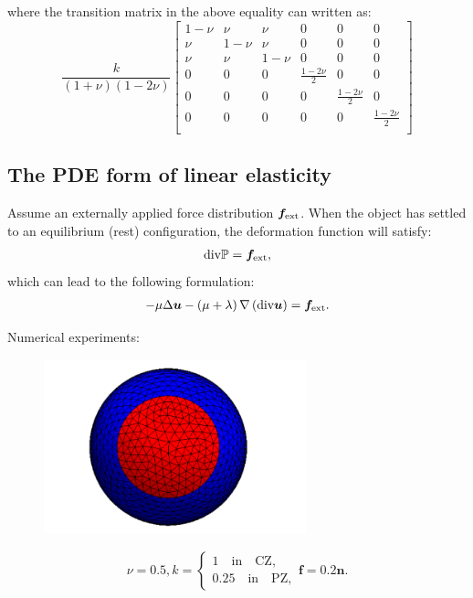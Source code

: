 \documentclass[11pt]{amsart}
\numberwithin{figure}{section}
\theoremstyle{plain}
\theoremstyle{definition}
\numberwithin{equation}{section}
\begin{document}
where the transition matrix in the above equality can written as:
\[
\frac{ k }{ \left(1+\nu\right) \left(1-2\nu\right) } 
\left[
\begin{array}{cccccc}
1 - \nu & \nu & \nu & 0 & 0 & 0 \\
\nu & 1 - \nu & \nu & 0 & 0 & 0 \\
\nu & \nu & 1 - \nu & 0 & 0 & 0 \\
0 & 0 & 0 & \frac{ 1-2\nu }{2 }  & 0 & 0 \\
0 & 0 & 0 & 0 & \frac{ 1-2\nu }{ 2 }  & 0 \\
0 & 0 & 0 & 0 & 0 & \frac{ 1-2\nu }{ 2 }  \\
\end{array}
\right]
\] 

\subsection{The PDE form of linear elasticity}
Assume an externally applied force distribution $\bm{f}_{\rm ext} $.
When the object has settled to an equilibrium (rest) configuration, the deformation function will satisfy: 
\begin{align}
  \text{div} \mathbb{P}  = \bm{f}_{\rm ext},  
\end{align}
which can lead to the following formulation:
\begin{align}
  - \mu \Delta \bm{u} 
  - \left(\mu + \lambda\right) \nabla 
  \left( \text{div} \bm{u} \right) 
  = \bm{f}_{\rm ext} .
\end{align}

Numerical experiments:
\begin{figure}[!tbh]
\includegraphics[width=3in]{./figures/k.png}
\end{figure}

\[
\nu = 0.5, 
k = 
\begin{cases}
1 \quad \text{in}\quad \text{CZ},\\
0.25 \quad \text{in} \quad \text{PZ},
\end{cases}
\bm{f} = 0.2 \bm{n}.
\] 
\end{document}
